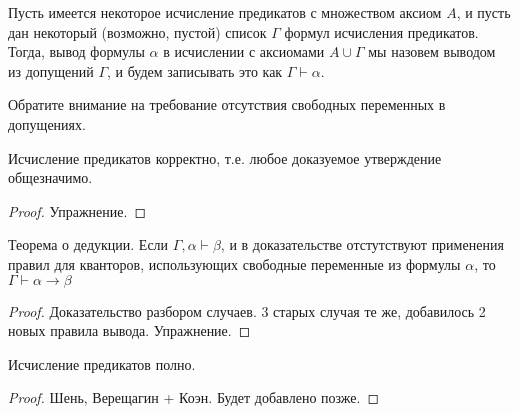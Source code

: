 \begin{definition}Пусть имеется некоторое исчисление предикатов с множеством
аксиом $A$, и пусть дан некоторый (возможно, пустой) список $\Gamma$ 
формул исчисления предикатов. Тогда, вывод формулы $\alpha$
в исчислении с аксиомами $A \cup \Gamma$ мы назовем выводом из 
допущений $\Gamma$, и будем записывать это как $\Gamma \vdash \alpha$.
\end{definition}

Обратите внимание на требование отсутствия свободных переменных в допущениях.

\begin{theorem}
Исчисление предикатов корректно, т.е. любое доказуемое утверждение общезначимо.
\end{theorem}

\begin{proof}Упражнение.\end{proof}

\begin{theorem}
Теорема о дедукции. Если $\Gamma, \alpha \vdash \beta$, 
и в доказательстве отстутствуют применения правил для кванторов, использующих
свободные переменные из формулы $\alpha$, то $\Gamma \vdash \alpha \rightarrow \beta$
\end{theorem}

\begin{proof}
Доказательство разбором случаев. 3 старых случая те же, добавилось 
2 новых правила вывода. Упражнение.
\end{proof}

\begin{theorem}
Исчисление предикатов полно.
\end{theorem}

\begin{proof}
Шень, Верещагин + Коэн. Будет добавлено позже.
\end{proof}
